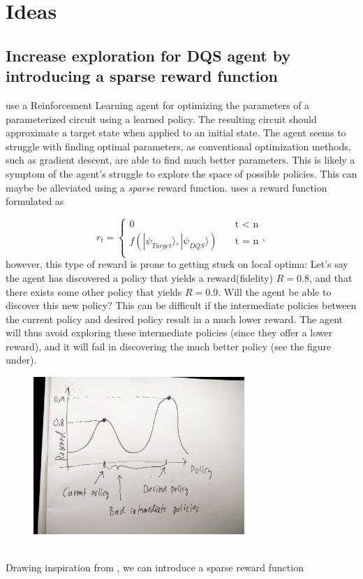 \documentclass{article}
\begin{document}
\newpage


\section{Ideas}

\subsection{Increase exploration for DQS agent by introducing a sparse reward function}

\cite{DQSRL} use a Reinforcement Learning agent for optimizing the parameters of a parameterized circuit using a learned policy. The resulting circuit should approximate a target state when applied to an initial state.
\newline
\newline
The agent seems to struggle with finding optimal parameters, as conventional optimization methods, such as gradient descent, are able to find much better parameters. This is likely a symptom of the agent's struggle to explore the space of possible policies. This can maybe be alleviated using a \emph{sparse} reward function. \cite{DQSRL} uses a reward function formulated as 

\[   
r_t = 
     \begin{cases}
       \text{0} &\quad\text{t $<$ n}\\
       \text{$f(|\psi_{Target}\rangle, |\psi_{DQS}\rangle)$} &\quad\text{t $=$ n}\\
     
     \end{cases},
\]
however, this type of reward is prone to getting stuck on local optima: Let's say the agent has discovered a policy that yields a reward(fidelity) $R=0.8$, and that there exists some other policy that yields $R=0.9$. Will the agent be able to discover this new policy? This can be difficult if the intermediate policies between the current policy and desired policy result in a much lower reward. The agent will thus avoid exploring these intermediate policies (since they offer a lower reward), and it will fail in discovering the much better policy (see the figure under).

\begin{figure}[h]
\includegraphics[width=8cm]{policy.png}
\end{figure}
\\
Drawing inspiration from \cite{QuantumComp}, we can introduce a sparse reward function
\end{document}
